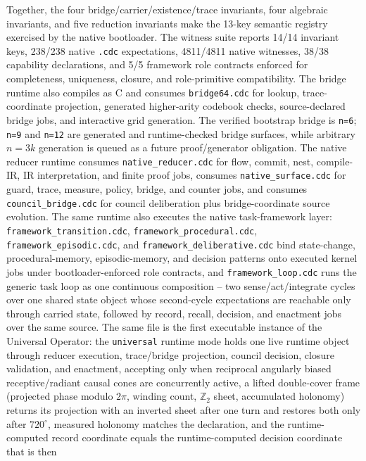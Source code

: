 \documentclass[11pt]{article}
\begin{document}
Together, the four bridge/carrier/existence/trace invariants, four algebraic
invariants, and five reduction invariants make the 13-key semantic registry
exercised by the native bootloader. The witness suite reports 14/14 invariant
keys, 238/238 native \texttt{.cdc} expectations, 4811/4811 native witnesses,
38/38 capability declarations, and 5/5 framework role contracts enforced for
completeness, uniqueness, closure, and role-primitive compatibility. The bridge
runtime also compiles as C and consumes
\texttt{bridge64.cdc} for lookup, trace-coordinate projection, generated
higher-arity codebook checks, source-declared bridge jobs, and interactive grid
generation. The verified bootstrap bridge is \texttt{n=6}; \texttt{n=9} and
\texttt{n=12} are generated and runtime-checked bridge surfaces, while arbitrary
$n=3k$ generation is queued as a future proof/generator obligation. The native reducer runtime consumes \nolinkurl{native_reducer.cdc}
for flow, commit, nest, compile-IR, IR interpretation, and finite proof jobs,
consumes \nolinkurl{native_surface.cdc} for guard, trace, measure, policy,
bridge, and counter jobs,
and consumes \nolinkurl{council_bridge.cdc} for council deliberation plus
bridge-coordinate source evolution. The same runtime also executes the native
task-framework layer: \nolinkurl{framework_transition.cdc},
\nolinkurl{framework_procedural.cdc}, \nolinkurl{framework_episodic.cdc}, and
\nolinkurl{framework_deliberative.cdc} bind state-change, procedural-memory,
episodic-memory, and decision patterns onto executed kernel jobs under
bootloader-enforced role contracts, and \nolinkurl{framework_loop.cdc} runs
the generic task loop as one continuous composition -- two sense/act/integrate
cycles over one shared state object whose second-cycle expectations are
reachable only through carried state, followed by record, recall, decision,
and enactment jobs over the same source. The same file is the first executable
instance of the Universal Operator: the \texttt{universal} runtime mode holds
one live runtime object through reducer execution, trace/bridge projection,
council decision, closure validation, and enactment, accepting only when
reciprocal angularly biased receptive/radiant causal cones are concurrently
active, a lifted double-cover frame (projected phase modulo $2\pi$, winding
count, $\mathbb{Z}_2$ sheet, accumulated holonomy) returns its projection with
an inverted sheet after one turn and restores both only after $720^{\circ}$,
measured holonomy matches the declaration, and the runtime-computed record
coordinate equals the runtime-computed decision coordinate that is then
\end{document}
